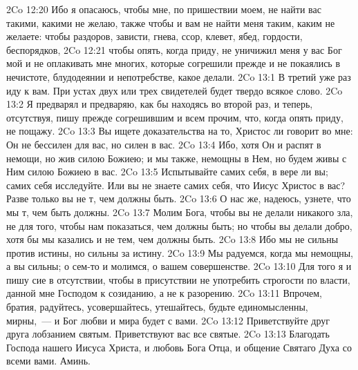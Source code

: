 \vs 2Co 12:20 Ибо я опасаюсь, чтобы мне, по пришествии моем, не найти вас такими, какими не желаю, также чтобы и вам не найти меня таким, каким не желаете: чтобы  раздоров, зависти, гнева, ссор, клевет, ябед, гордости, беспорядков,
\vs 2Co 12:21 чтобы опять, когда приду, не уничижил меня у вас Бог мой и  не оплакивать мне многих, которые согрешили прежде и не покаялись в нечистоте, блудодеянии и непотребстве, какое делали.
\vs 2Co 13:1 В третий уже раз иду к вам. При устах двух или трех свидетелей будет твердо всякое слово.
\vs 2Co 13:2 Я предварял и предваряю, как бы находясь  во второй раз, и теперь, отсутствуя, пишу прежде согрешившим и всем прочим, что, когда опять приду, не пощажу.
\vs 2Co 13:3 Вы ищете доказательства на то, Христос ли говорит во мне: Он не бессилен для вас, но силен в вас.
\vs 2Co 13:4 Ибо, хотя Он и распят в немощи, но жив силою Божиею; и мы также,  немощны в Нем, но будем живы с Ним силою Божиею в вас.
\rsbpar\vs 2Co 13:5 Испытывайте самих себя, в вере ли вы; самих себя исследуйте. Или вы не знаете самих себя, что Иисус Христос в вас? Разве только вы не т, чем должны быть.
\vs 2Co 13:6 О нас же, надеюсь, узнете, что мы т, чем быть должны.
\vs 2Co 13:7 Молим Бога, чтобы вы не делали никакого зла, не для того, чтобы нам показаться, чем должны быть; но чтобы вы делали добро, хотя бы мы казались и не тем, чем должны быть.
\vs 2Co 13:8 Ибо мы не сильны против истины, но сильны за истину.
\vs 2Co 13:9 Мы радуемся, когда мы немощны, а вы сильны; о сем-то и молимся, о вашем совершенстве.
\vs 2Co 13:10 Для того я и пишу сие в отсутствии, чтобы в присутствии не употребить строгости по власти, данной мне Господом к созиданию, а не к разорению.
\rsbpar\vs 2Co 13:11 Впрочем, братия, радуйтесь, усовершайтесь, утешайтесь, будьте единомысленны, мирны,~--- и Бог любви и мира будет с вами.
\vs 2Co 13:12 Приветствуйте друг друга лобзанием святым. Приветствуют вас все святые.
\rsbpar\vs 2Co 13:13 Благодать Господа нашего Иисуса Христа, и любовь Бога Отца, и общение Святаго Духа со всеми вами. Аминь.
